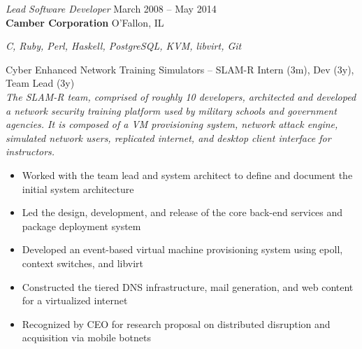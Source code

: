 \documentclass[margin,line]{resume}
\begin{document}
\begin{resume}
{\sl Lead Software Developer} \hfill
     March 2008 -- May 2014\\
     \textbf{Camber Corporation} \hfill
     O'Fallon, IL\\[4pt]
{\small\centering\textit{C, Ruby, Perl, Haskell, PostgreSQL, KVM, libvirt, Git}\par}\vspace*{-\baselineskip}
\vspace{4pt}
{\small Cyber Enhanced Network Training Simulators -- SLAM-R  \hfill  Intern (3m), Dev (3y), Team Lead (3y)}\\
{\small\textit{The SLAM-R team, comprised of roughly 10 developers, architected and developed a network security
training platform used by military schools and government agencies. It is composed of a VM provisioning system, network
attack engine, simulated network users, replicated internet, and desktop client interface for instructors.}}
\begin{itemize} \itemsep -2pt %
\small\item Worked with the team lead and system architect to define and document the initial system architecture
\small\item Led the design, development, and release of the core back-end services and package deployment system
\small\item Developed an event-based virtual machine provisioning system using epoll, context switches, and libvirt
\small\item Constructed the tiered DNS infrastructure, mail generation, and web content for a virtualized internet
\small\item Recognized by CEO for research proposal on distributed disruption and acquisition via mobile botnets

\end{itemize}
\end{resume}
\end{document}
